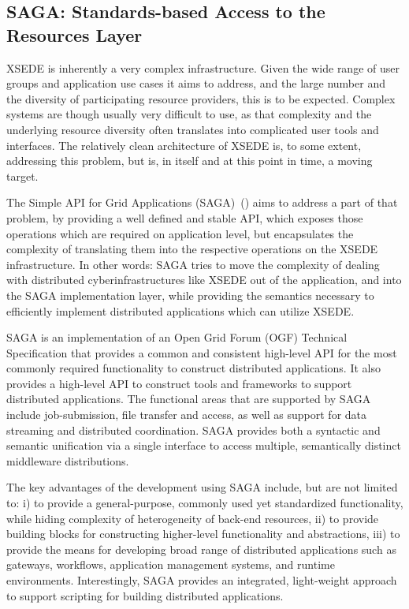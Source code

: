 \documentclass{sig-alternate}
\begin{document}
\subsection{SAGA: Standards-based Access to the Resources Layer}

XSEDE is inherently a very complex infrastructure.  Given the wide
range of user groups and application use cases it aims to address,
and the large number and the diversity of participating resource
providers, this is to be expected.  Complex systems are though
usually very difficult to use, as that complexity and the underlying
resource diversity often translates into complicated user tools and
interfaces.  The relatively clean architecture of XSEDE is, to some
extent, addressing this problem, but is, in itself and at this point
in time, a moving target.

The Simple API for Grid Applications (SAGA)~(\cite{saga_url}) aims to address a
part of that problem, by providing a well defined and stable API, which
exposes those operations which are required on application level, but
encapsulates the complexity of translating them into the respective
operations on the XSEDE infrastructure.  In other words: SAGA tries
to move the complexity of dealing with distributed
cyberinfrastructures like XSEDE out of the application, and into the
SAGA implementation layer, while providing the semantics necessary to
efficiently implement distributed applications which can utilize
XSEDE.

SAGA is an implementation of an Open Grid Forum (OGF) Technical Specification
that provides a common and consistent high-level API for the most
commonly required functionality to construct distributed applications.
It also provides a high-level API to construct tools and frameworks to
support distributed applications. The functional areas that are
supported by SAGA include job-submission, file transfer and access, as
well as support for data streaming and distributed coordination. SAGA
provides both a syntactic and semantic unification via a single
interface to access multiple, semantically distinct middleware
distributions.


The key advantages of the development using SAGA include, but are not
limited to: i) to provide a general-purpose, commonly used yet
standardized functionality, while hiding complexity of heterogeneity
of back-end resources, ii) to provide building blocks for constructing
higher-level functionality and abstractions, iii) to provide the means
for developing broad range of distributed applications such as
gateways, workflows, application management systems, and runtime
environments. Interestingly, SAGA provides an integrated, light-weight
approach to support scripting for building distributed applications.
\end{document}
